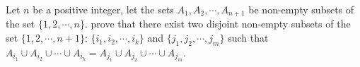 Let $ n$ be a positive integer, let the sets $ A_{1},A_{2},\cdots,A_{n \plus{} 1}$ be non-empty subsets of the set $ \{1,2,\cdots,n\}.$ prove that there exist two disjoint non-empty subsets of the set $ \{1,2,\cdots,n \plus{} 1\}$: $ \{i_{1},i_{2},\cdots,i_{k}\}$ and $ \{j_{1},j_{2},\cdots,j_{m}\}$ such that $ A_{i_{1}}\cup A_{i_{2}}\cup\cdots\cup A_{i_{k}} \equal{} A_{j_{1}}\cup A_{j_{2}}\cup\cdots\cup A_{j_{m}}$.

